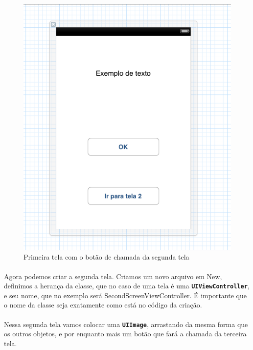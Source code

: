 \documentclass[a4paper,12pt,brazil,doubleside]{book}
\begin{document}
\begin{figure}[h]
  \centering
  \includegraphics[totalheight=0.3\textheight]{../figuras/ios/1/simulador3_tela1.png}
  \caption{Primeira tela com o botão de chamada da segunda tela}
  \label{fig:a}
\end{figure}

\paragraph{}Agora podemos criar a segunda tela. Criamos um novo arquivo em New, definimos a herança da classe, que no caso de uma tela é uma \texttt{\textbf{UIViewController}}, e seu nome, que no exemplo será SecondScreenViewController. É importante que o nome da classe seja exatamente como está no código da criação.
\paragraph{}Nessa segunda tela vamos colocar uma \texttt{\textbf{UIImage}}, arrastando da mesma forma que os outros objetos, e por enquanto mais um botão que fará a chamada da terceira tela.
\end{document}
